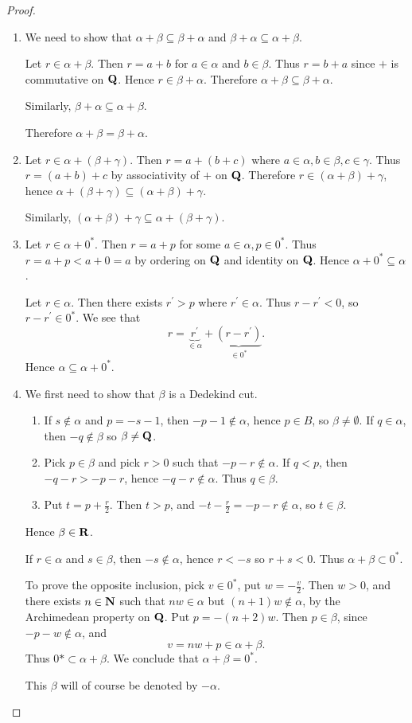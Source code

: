 \begin{proof} \
\begin{enumerate}[label=(\roman*)]
\item We need to show that $\alpha+\beta\subseteq\beta+\alpha$ and $\beta+\alpha\subseteq\alpha+\beta$.

Let $r\in\alpha+\beta$. Then $r=a+b$ for $a\in\alpha$ and $b\in\beta$. Thus $r=b+a$ since $+$ is commutative on $\mathbf Q$. Hence $r\in\beta+\alpha$. Therefore $\alpha+\beta\subseteq\beta+\alpha$.

Similarly, $\beta+\alpha\subseteq\alpha+\beta$.

Therefore $\alpha+\beta=\beta+\alpha$.

\item Let $r\in\alpha+(\beta+\gamma)$. Then $r=a+(b+c)$ where $a\in\alpha,b\in\beta,c\in\gamma$. Thus $r=(a+b)+c$ by associativity of $+$ on $\mathbf Q$. Therefore $r\in(\alpha+\beta)+\gamma$, hence $\alpha+(\beta+\gamma)\subseteq(\alpha+\beta)+\gamma$.

Similarly, $(\alpha+\beta)+\gamma\subseteq\alpha+(\beta+\gamma)$.

\item Let $r\in\alpha+0^*$. Then $r=a+p$ for some $a\in\alpha,p\in0^*$. Thus $r=a+p<a+0=a$ by ordering on $\mathbf Q$ and identity on $\mathbf Q$. Hence $\alpha+0^*\subseteq\alpha$.

Let $r\in\alpha$. Then there exists $r^\prime>p$ where $r^\prime\in\alpha$. Thus $r-r^\prime<0$, so $r-r^\prime\in0^*$. We see that
\[ r=\underbrace{r^\prime}_{\in\alpha}+\underbrace{(r-r^\prime)}_{\in0^*}. \]
Hence $\alpha\subseteq\alpha+0^*$.

\item We first need to show that $\beta$ is a Dedekind cut.
\begin{enumerate}[label=(\roman*)]
\item If $s\notin\alpha$ and $p=-s-1$, then $-p-1\notin\alpha$, hence $p\in B$, so $\beta\neq\emptyset$. If $q\in\alpha$, then $-q\notin\beta$ so $\beta\neq\mathbf Q$.
\item Pick $p\in\beta$ and pick $r>0$ such that $-p-r\notin\alpha$. If $q<p$, then $-q-r>-p-r$, hence $-q-r\notin\alpha$. Thus $q\in\beta$.
\item Put $t=p+\frac{r}{2}$. Then $t>p$, and $-t-\frac{r}{2}=-p-r\notin\alpha$, so $t\in\beta$.
\end{enumerate}
Hence $\beta\in\mathbf R$.

If $r\in\alpha$ and $s\in\beta$, then $-s\notin\alpha$, hence $r<-s$ so $r+s<0$. Thus $\alpha+\beta\subset0^*$.

To prove the opposite inclusion, pick $v\in0^*$, put $w=-\frac{v}{2}$. Then $w>0$, and there exists $n\in\mathbf N$ such that $nw\in\alpha$ but $(n+1)w\notin\alpha$, by the Archimedean property on $\mathbf Q$. Put $p=-(n+2)w$. Then $p\in\beta$, since $-p-w\notin\alpha$, and
\[v=nw+p\in\alpha+\beta.\]
Thus $0*\subset\alpha+\beta$. We conclude that $\alpha+\beta=0^*$.

This $\beta$ will of course be denoted by $-\alpha$.
\end{enumerate}
\end{proof}

